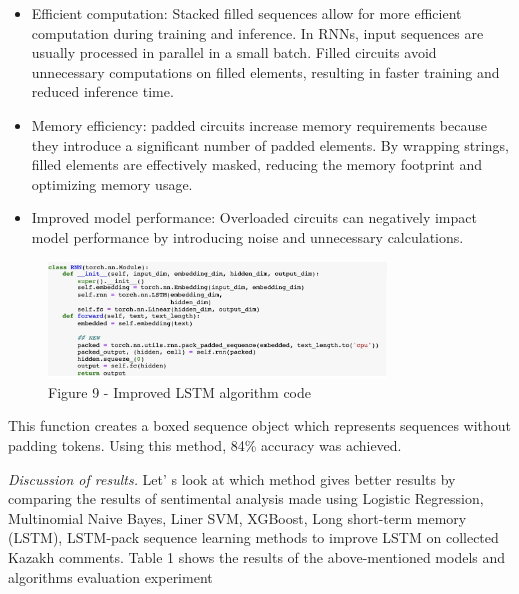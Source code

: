 \begin{multicols}{2}
\begin{itemize}[leftmargin=*]
\item
  Efficient computation: Stacked filled sequences allow for more
  efficient computation during training and inference. In RNNs, input
  sequences are usually processed in parallel in a small batch. Filled
  circuits avoid unnecessary computations on filled elements, resulting
  in faster training and reduced inference time.
\item
  Memory efficiency: padded circuits increase memory requirements
  because they introduce a significant number of padded elements. By
  wrapping strings, filled elements are effectively masked, reducing the
  memory footprint and optimizing memory usage.
\item
  Improved model performance: Overloaded circuits can negatively impact
  model performance by introducing noise and unnecessary calculations.
\end{itemize}
\end{multicols}

\begin{figure}[H]
	\centering
	\includegraphics[width=0.8\textwidth]{media/ict/image16}
	\caption*{Figure 9 - Improved LSTM algorithm code}
\end{figure}

\begin{multicols}{2}
This function creates a boxed sequence object which represents sequences
without padding tokens. Using this method, 84\% accuracy was achieved.

\emph{Discussion of results.} Let' s look at which method
gives better results by comparing the results of sentimental analysis
made using Logistic Regression, Multinomial Naive Bayes, Liner SVM,
XGBoost, Long short-term memory (LSTM), LSTM-pack sequence learning
methods to improve LSTM on collected Kazakh comments. Table 1 shows the
results of the above-mentioned models and algorithms evaluation
experiment
\end{multicols}

